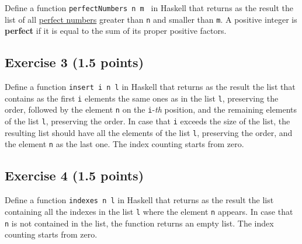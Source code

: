 \documentclass [11pt, a4wide, twoside]{article}
\begin{document}
Define a function \texttt{perfectNumbers n m } in Haskell that returns as the result the list of all \href{https://en.wikipedia.org/wiki/Perfect_number}{perfect numbers} greater than \texttt{n} and smaller than \texttt{m}. A positive integer is \textbf{perfect} if it is equal to the sum of its proper positive factors.

\vspace{0.2cm}

\subsection*{Exercise 3 (1.5 points)}

Define a function \texttt{insert i n l} in Haskell that returns as the result the list that contains as the first \texttt{i} elements the same ones as in the list \texttt{l}, preserving the order, followed by the element \texttt{n} on the \mbox{\texttt{i}-\textit{th}} position, and the remaining elements of the list \texttt{l}, preserving the order. In case that \texttt{i} exceeds the size of the list, the resulting list should have all the elements of the list \texttt{l}, preserving the order, and the element \texttt{n} as the last one. The index counting starts from zero.

\newpage

\vspace{0.2cm}

\subsection*{Exercise 4 (1.5 points)}

Define a function \texttt{indexes n l} in Haskell that returns as the result the list containing all the indexes in the list \texttt{l} where the element \texttt{n} appears. In case that \texttt{n} is not contained in the list, the function returns an empty list. The index counting starts from zero.

\vspace{0.2cm}
\end{document}
